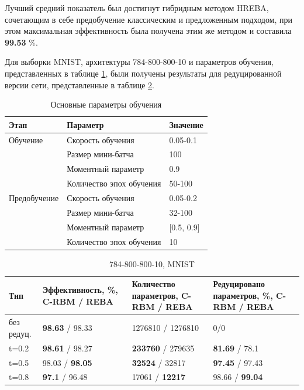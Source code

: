 \documentclass{thesisby}
\begin{document}
Лучший средний показатель был достигнут гибридным методом HREBA, сочетающим в себе предобучение классическим и предложенным подходом, при этом максимальная эффективность была получена этим же методом и составила \textbf{99.53} \%.

Для выборки MNIST, архитектуры 784-800-800-10 и параметров обучения, представленных в таблице \ref{table:params_mnist_reduce}, были получены результаты для редуцированной версии сети, представленные в таблице \ref{table:results_mnist_reduce}.

\begin{table} [h!]
  \small
  \caption{Основные параметры обучения}\label{table:params_mnist_reduce}
\centering
\begin{tabular}{| p{3cm} | p{6cm} | p{2cm} |}
  \hline
    \textbf{Этап} & \textbf{Параметр} & \textbf{Значение}\\
    \hline
    Обучение & Скорость обучения & 0.05-0.1\\
    \cline{2-3}
    & Размер мини-батча & 100 \\
    \cline{2-3}
    & Моментный параметр & 0.9 \\
    \cline{2-3}
    & Количество эпох обучения & 50-100\\
    \hline
    Предобучение & Скорость обучения & 0.05-0.2\\
    \cline{2-3}
    & Размер мини-батча & 32-100 \\
    \cline{2-3}
    & Моментный параметр & [0.5, 0.9] \\
    \cline{2-3}
    & Количество эпох обучения & 10\\
    \hline
\end{tabular}
\end{table}	
	
\begin{table} [h!]
  \small
  \caption{784-800-800-10, MNIST}\label{table:results_mnist_reduce}
\centering
\begin{tabular}{| p{2cm} | p{4cm} | p{4cm} | p{4cm} |}
  \hline
    \textbf{Тип} & \textbf{Эффективность, \%, C-RBM / REBA} & \textbf{Количество параметров, C-RBM / REBA} & \textbf{Редуцировано параметров, \%, C-RBM / REBA}\\
    \hline
    без редуц. & \textbf{98.63} / 98.33 & 1276810 / 1276810 & 0/0\\
    \hline
    t=0.2 & \textbf{98.61} / 98.27 & \textbf{233760} / 279635 & \textbf{81.69} / 78.1\\
    \hline
    t=0.5 & 98.03 / \textbf{98.05} & \textbf{32524} / 32817 & \textbf{97.45} / 97.43\\
    \hline
    t=0.8 & \textbf{97.1} / 96.48 & 17061 / \textbf{12217} & 98.66 / \textbf{99.04}\\
    \hline
\end{tabular}
\end{table}
\end{document}
